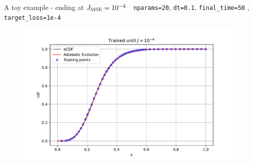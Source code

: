 \documentclass[9pt, xcolor={svgnames}, hyperref={colorlinks, linkcolor=black, citecolor=amethyst, urlcolor=amethyst}]{beamer}
\begin{document}
\begin{frame}[fragile]{A toy example - ending at $J_{\rm MSE}=10^{-4}$}
\large
\faArrowCircleRight\,\, \texttt{nparams=20}, \texttt{dt=0.1}, \texttt{final\_time=50}
, \texttt{target\_loss=1e-4}
\begin{figure}
    \includegraphics[width=1\textwidth]{figures/ev3.pdf}
\end{figure}
\end{frame}
\end{document}
